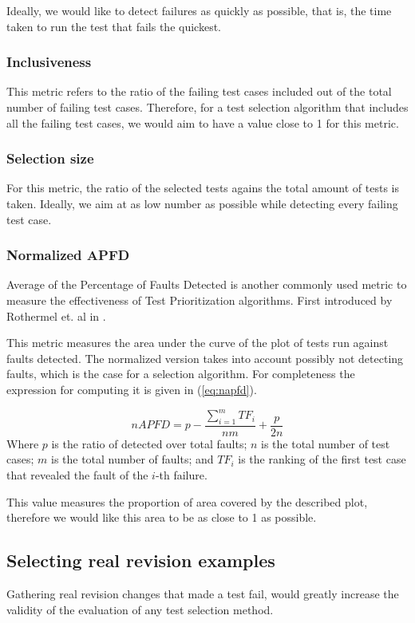 \documentclass{article}
\begin{document}
Ideally, we would like to detect failures as quickly as possible, that is, the time taken to run the test that fails the quickest.
\subsubsection{Inclusiveness}
This metric refers to the ratio of the failing test cases included out of the total number of failing test cases. Therefore, for a test selection algorithm that includes all the failing test cases, we would aim to have a value close to 1 for this metric.
\subsubsection{Selection size}
For this metric, the ratio of the selected tests agains the total amount of tests is taken. Ideally, we aim at as low number as possible while detecting every failing test case.
\subsubsection{Normalized APFD}
Average of the Percentage of Faults Detected is another commonly used metric to measure the effectiveness of Test Prioritization algorithms. First introduced by Rothermel et. al in \cite{962562}.

This metric measures the area under the curve of the plot of tests run against faults detected. The normalized version takes into account possibly not detecting faults, which is the case for a selection algorithm. For completeness the expression for computing it is given in (\ref{eq:napfd}).

\begin{equation}
  \label{eq:napfd}
    nAPFD = p - \frac{\sum_{i=1}^{m}TF_i}{nm}+\frac{p}{2n}
\end{equation}
Where $p$ is the ratio of detected over total faults; $n$ is the total number of test cases; $m$ is the total number of faults; and $TF_i$ is the ranking of the first test case that revealed the fault of the $i$-th failure.

This value measures the proportion of area covered by the described plot, therefore we would like this area to be as close to 1 as possible.

\subsection{Selecting real revision examples}\label{section:evaluation-real}
Gathering real revision changes that made a test fail, would greatly increase the validity of the evaluation of any test selection method.
\end{document}
